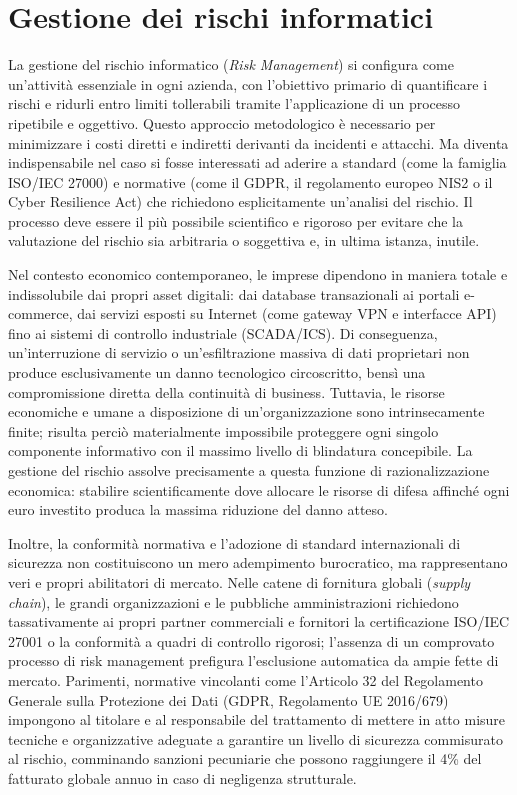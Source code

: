 \documentclass[../../main.tex]{subfiles}
\begin{document}
\chapter{Gestione dei rischi informatici}
\label{ch:gestione_rischi}

La gestione del rischio informatico (\textit{Risk Management}) si configura come un'attività essenziale in ogni azienda, con l'obiettivo primario di quantificare i rischi e ridurli entro limiti tollerabili tramite l'applicazione di un processo ripetibile e oggettivo. Questo approccio metodologico è necessario per minimizzare i costi diretti e indiretti derivanti da incidenti e attacchi. Ma diventa indispensabile nel caso si fosse interessati ad aderire a standard (come la famiglia ISO/IEC 27000) e normative (come il GDPR, il regolamento europeo NIS2 o il Cyber Resilience Act) che richiedono esplicitamente un'analisi del rischio. Il processo deve essere il più possibile scientifico e rigoroso per evitare che la valutazione del rischio sia arbitraria o soggettiva e, in ultima istanza, inutile.

Nel contesto economico contemporaneo, le imprese dipendono in maniera totale e indissolubile dai propri asset digitali: dai database transazionali ai portali e-commerce, dai servizi esposti su Internet (come gateway VPN e interfacce API) fino ai sistemi di controllo industriale (SCADA/ICS). Di conseguenza, un'interruzione di servizio o un'esfiltrazione massiva di dati proprietari non produce esclusivamente un danno tecnologico circoscritto, bensì una compromissione diretta della continuità di business. Tuttavia, le risorse economiche e umane a disposizione di un'organizzazione sono intrinsecamente finite; risulta perciò materialmente impossibile proteggere ogni singolo componente informativo con il massimo livello di blindatura concepibile. La gestione del rischio assolve precisamente a questa funzione di razionalizzazione economica: stabilire scientificamente dove allocare le risorse di difesa affinché ogni euro investito produca la massima riduzione del danno atteso.

Inoltre, la conformità normativa e l'adozione di standard internazionali di sicurezza non costituiscono un mero adempimento burocratico, ma rappresentano veri e propri abilitatori di mercato. Nelle catene di fornitura globali (\textit{supply chain}), le grandi organizzazioni e le pubbliche amministrazioni richiedono tassativamente ai propri partner commerciali e fornitori la certificazione ISO/IEC 27001 o la conformità a quadri di controllo rigorosi; l'assenza di un comprovato processo di risk management prefigura l'esclusione automatica da ampie fette di mercato. Parimenti, normative vincolanti come l'Articolo 32 del Regolamento Generale sulla Protezione dei Dati (GDPR, Regolamento UE 2016/679) impongono al titolare e al responsabile del trattamento di mettere in atto misure tecniche e organizzative adeguate a garantire un livello di sicurezza commisurato al rischio, comminando sanzioni pecuniarie che possono raggiungere il 4\% del fatturato globale annuo in caso di negligenza strutturale.
\end{document}
